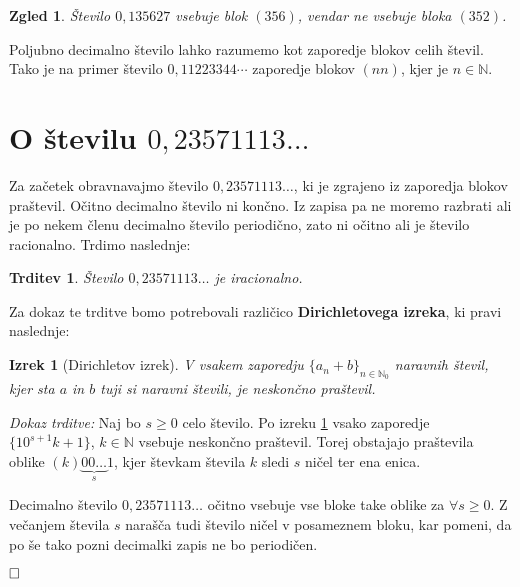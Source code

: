 \documentclass[a4paper,12pt]{article}
\def\N{\mathbb{N}} %
\def\qed{$\hfill\Box$}   %
\newtheorem{izrek}{Izrek}
\newtheorem{trditev}{Trditev}
\newtheorem{zgled}{Zgled}
\begin{document}
\begin{zgled}
    Število $0,135627$ vsebuje blok $(356)$, vendar ne vsebuje bloka $(352)$.
\end{zgled}

Poljubno decimalno število lahko razumemo kot zaporedje blokov celih števil.
Tako je na primer število $0,11223344 \cdots$ zaporedje blokov $(nn)$,
kjer je $n \in \N$.


\section{O številu $0,23571113 \dots$}

Za začetek obravnavajmo število $0,23571113 \dots$, ki je zgrajeno iz zaporedja
blokov praštevil. Očitno decimalno število ni končno. Iz zapisa pa ne moremo razbrati ali 
je po nekem členu decimalno število periodično, zato ni očitno ali je število racionalno.
Trdimo naslednje:

\begin{trditev}
    \label{trditev praštevila}
    Število $0,23571113 \dots$ je iracionalno.
\end{trditev}

Za dokaz te trditve bomo potrebovali različico \textbf{Dirichletovega izreka}, ki pravi naslednje:

\begin{izrek}[Dirichletov izrek]
    \label{Dirichletov izrek}
    V vsakem zaporedju $ \lbrace a_n + b \rbrace_{n \in \N_0}$ naravnih števil, kjer sta $a$ in $b$
    tuji si naravni števili, je neskončno praštevil.
\end{izrek}

\noindent
{\em Dokaz trditve:\/} Naj bo $s \geq 0$ celo število. Po izreku \ref{Dirichletov izrek} vsako zaporedje
$ \{10^{s+1}k + 1\}$, $k \in \N$ vsebuje neskončno praštevil. Torej obstajajo praštevila
oblike $(k)\underbrace{00 \dots}_{s}1$, kjer števkam števila $k$ sledi $s$ ničel ter ena enica. 

Decimalno število $0,23571113\dots$ očitno vsebuje vse bloke take oblike za $\forall s \geq 0$. Z večanjem števila
$s$ narašča tudi število ničel v posameznem bloku, kar pomeni, da po še tako pozni decimalki zapis ne bo periodičen.

\qed


\end{document}
